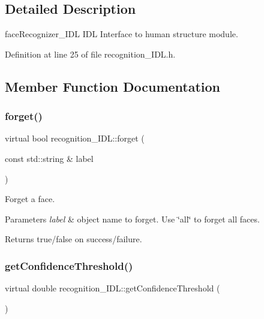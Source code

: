 \subsection{Detailed Description}
face\+Recognizer\+\_\+\+I\+DL I\+DL Interface to human structure module. 

Definition at line 25 of file recognition\+\_\+\+I\+D\+L.\+h.



\subsection{Member Function Documentation}
\mbox{\label{classrecognition__IDL_a5ddaf7e807d0bb5685ee4b87e8817bf3}} 
\subsubsection{\texorpdfstring{forget()}{forget()}}
{\footnotesize\ttfamily virtual bool recognition\+\_\+\+I\+D\+L\+::forget (\begin{DoxyParamCaption}\item[{const std\+::string \&}]{label }\end{DoxyParamCaption})\hspace{0.3cm}{\ttfamily [virtual]}}



Forget a face. 


\begin{DoxyParams}{Parameters}
{\em label} & object name to forget. Use \char`\"{}all\char`\"{} to forget all faces. \\
\hline
\end{DoxyParams}
\begin{DoxyReturn}{Returns}
true/false on success/failure. 
\end{DoxyReturn}
\mbox{\label{classrecognition__IDL_a5cc457fe6b185acc8a4b1f541a002cee}} 
\subsubsection{\texorpdfstring{get\+Confidence\+Threshold()}{getConfidenceThreshold()}}
{\footnotesize\ttfamily virtual double recognition\+\_\+\+I\+D\+L\+::get\+Confidence\+Threshold (\begin{DoxyParamCaption}{ }\end{DoxyParamCaption})\hspace{0.3cm}{\ttfamily [virtual]}}



